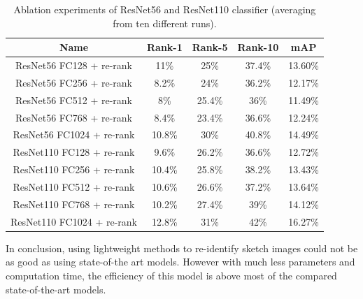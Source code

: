 \documentclass[conference]{IEEEtran}
\begin{document}
		\begin{table}[h!]
		\begin{center}
			\begin{tabular}{|c|c|c|c|c|}
				\hline
				\textbf{Name} & \textbf{Rank-1} & \textbf{Rank-5} & \textbf{Rank-10} & \textbf{mAP} \\ \hline
				ResNet56 FC128 + re-rank & 11\% & 25\% & 37.4\% & 13.60\%\\ \hline
				ResNet56 FC256 + re-rank & 8.2\% & 24\% & 36.2\% & 12.17\%\\ \hline
				ResNet56 FC512 + re-rank  & 8\% & 25.4\% & 36\% & 11.49\%\\ \hline
				ResNet56 FC768 + re-rank & 8.4\% & 23.4\% & 36.6\% & 12.24\%\\ \hline
				ResNet56 FC1024 + re-rank & 10.8\% & 30\% & 40.8\% & 14.49\%\\ \hline
				ResNet110 FC128 + re-rank & 9.6\% & 26.2\% & 36.6\% & 12.72\%\\ \hline
				ResNet110 FC256 + re-rank & 10.4\% & 25.8\% & 38.2\% & 13.43\%\\ \hline
				ResNet110 FC512 + re-rank & 10.6\% & 26.6\% & 37.2\% & 13.64\%\\ \hline
				ResNet110 FC768 + re-rank & 10.2\% & 27.4\% & 39\% & 14.12\%\\ \hline
				ResNet110 FC1024 + re-rank & 12.8\% & 31\% & 42\% & 16.27\%\\ \hline
			\end{tabular}
		\end{center}
		\vspace{1ex}
		\caption{Ablation experiments of ResNet56 and ResNet110 classifier (averaging from ten different runs).}
		\label{tabel:2}
	\end{table}
	
	In conclusion, using lightweight methods to re-identify sketch images could not be as good as using state-of-the art models. However with much less parameters and computation time, the efficiency of this model is above most of the compared state-of-the-art models. 
    
    \nocite{*}	
	
	
\end{document}
